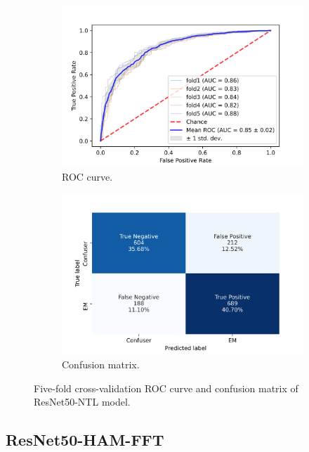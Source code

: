 \begin{figure}[h!]
	\centering
	\begin{subfigure}[b]{0.49\textwidth}
		\centering
		\includegraphics[width=\textwidth,keepaspectratio]{images/Supplement4/image28.png}
		\caption{ROC curve.}
	\end{subfigure}
	\hfill
	\begin{subfigure}[b]{0.49\textwidth}
		\centering
		\includegraphics[width=\textwidth,keepaspectratio]{images/Supplement4/image34.png}
		\caption{Confusion matrix.}
	\end{subfigure}
	\caption{Five-fold cross-validation ROC curve and confusion matrix of ResNet50-NTL model.}
\end{figure}

\vfill\clearpage
\subsection{ResNet50-HAM-FFT}

